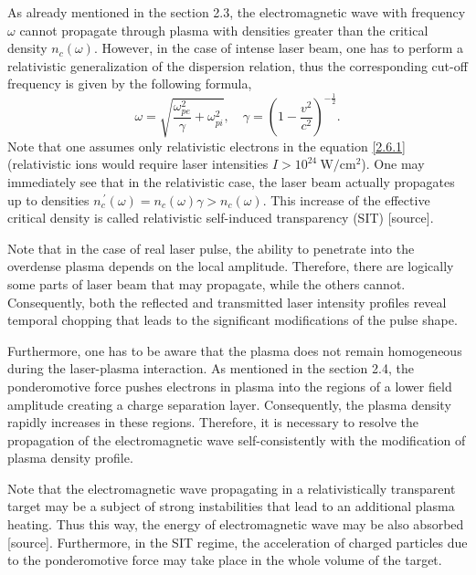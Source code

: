 As already mentioned in the section 2.3, the electromagnetic wave with frequency $ \omega $ cannot propagate through plasma with densities greater than the critical density $ n_c \left( \omega \right) $. However, in the case of intense laser beam, one has to perform a relativistic generalization of the dispersion relation, thus the corresponding cut-off frequency is given by the following formula,
\begin{equation}
\label{2.6.1}
\omega = \sqrt{\frac{\omega_{pe}^2}{\gamma} + \omega_{pi}^2}, \quad \gamma = \left( 1 - \frac{v^{2}}{c^2} \right)^{-\frac{1}{2}}.
\end{equation}
Note that one assumes only relativistic electrons in the equation \ref{2.6.1} (relativistic ions would require laser intensities $ I > 10^{24} \ \mathrm{W/cm^2} $). One may immediately see that in the relativistic case, the laser beam actually propagates up to densities $ n_c^{\: \prime} \left( \omega \right) = n_c \left( \omega \right) \gamma > n_c \left( \omega \right) $. This increase of the effective critical density is called relativistic self-induced transparency (SIT) [source].

Note that in the case of real laser pulse, the ability to penetrate into the overdense plasma depends on the local amplitude. Therefore, there are logically some parts of laser beam that may propagate, while the others cannot. Consequently, both the reflected and transmitted laser intensity profiles reveal temporal chopping that leads to the significant modifications of the pulse shape.

Furthermore, one has to be aware that the plasma does not remain homogeneous during the laser-plasma interaction. As mentioned in the section 2.4, the ponderomotive force pushes electrons in plasma into the regions of a lower field amplitude creating a charge separation layer. Consequently, the plasma density rapidly increases in these regions. Therefore, it is necessary to resolve the propagation of the electromagnetic wave self-consistently with the modification of plasma density profile.

Note that the electromagnetic wave propagating in a relativistically transparent target may be a subject of strong instabilities that lead to an additional plasma heating. Thus this way, the energy of electromagnetic wave may be also absorbed [source]. Furthermore, in the SIT regime, the acceleration of charged particles due to the ponderomotive force may take place in the whole volume of the target.

